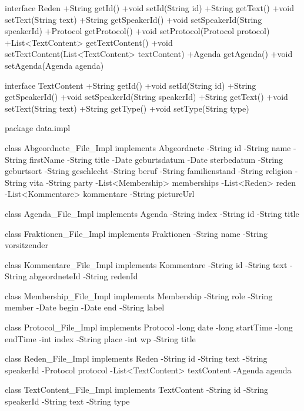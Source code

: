 {  interface Reden {
    +String getId()
    +void setId(String id)
    +String getText()
    +void setText(String text)
    +String getSpeakerId()
    +void setSpeakerId(String speakerId)
    +Protocol getProtocol()
    +void setProtocol(Protocol protocol)
    +List<TextContent> getTextContent()
    +void setTextContent(List<TextContent> textContent)
    +Agenda getAgenda()
    +void setAgenda(Agenda agenda)
  }

  interface TextContent {
    +String getId()
    +void setId(String id)
    +String getSpeakerId()
    +void setSpeakerId(String speakerId)
    +String getText()
    +void setText(String text)
    +String getType()
    +void setType(String type)
  }

}

package data.impl {

  class Abgeordnete_File_Impl implements Abgeordnete {
    -String id
    -String name
    -String firstName
    -String title
    -Date geburtsdatum
    -Date sterbedatum
    -String geburtsort
    -String geschlecht
    -String beruf
    -String familienstand
    -String religion
    -String vita
    -String party
    -List<Membership> memberships
    -List<Reden> reden
    -List<Kommentare> kommentare
    -String pictureUrl
  }

  class Agenda_File_Impl implements Agenda {
    -String index
    -String id
    -String title
  }

  class Fraktionen_File_Impl implements Fraktionen {
    -String name
    -String vorsitzender
  }

  class Kommentare_File_Impl implements Kommentare {
    -String id
    -String text
    -String abgeordneteId
    -String redenId
  }

  class Membership_File_Impl implements Membership {
    -String role
    -String member
    -Date begin
    -Date end
    -String label
  }

  class Protocol_File_Impl implements Protocol {
    -long date
    -long startTime
    -long endTime
    -int index
    -String place
    -int wp
    -String title
  }

  class Reden_File_Impl implements Reden {
    -String id
    -String text
    -String speakerId
    -Protocol protocol
    -List<TextContent> textContent
    -Agenda agenda
  }

  class TextContent_File_Impl implements TextContent {
    -String id
    -String speakerId
    -String text
    -String type
  }

}

